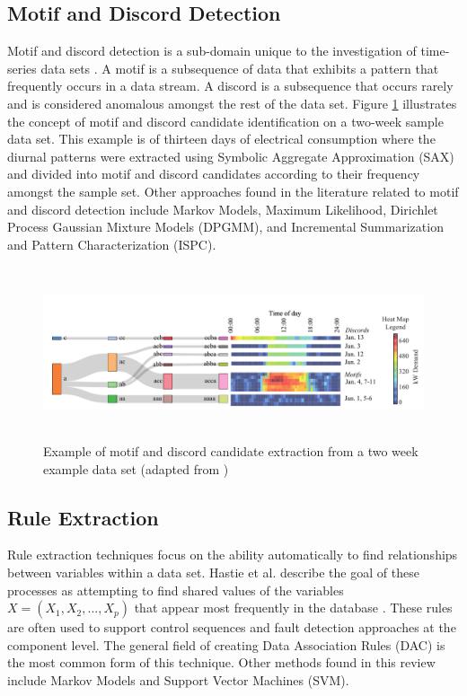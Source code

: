 \documentclass[preprint,12pt,3p]{elsarticle}
\begin{document}
\subsection{Motif and Discord Detection}
Motif and discord detection is a sub-domain unique to the investigation of time-series data sets \cite{senin_grammarviz_2014}. A motif is a subsequence of data that exhibits a pattern that frequently occurs in a data stream. A discord is a subsequence that occurs rarely and is considered anomalous amongst the rest of the data set. Figure \ref{fig:motifdiscordexample} illustrates the concept of motif and discord candidate identification on a two-week sample data set. This example is of thirteen days of electrical consumption where the diurnal patterns were extracted using Symbolic Aggregate Approximation (SAX) and divided into motif and discord candidates according to their frequency amongst the sample set. Other approaches found in the literature related to motif and discord detection include Markov Models, Maximum Likelihood, Dirichlet Process Gaussian Mixture Models (DPGMM), and Incremental Summarization and Pattern Characterization (ISPC).

\begin{figure}[ht!]
\centering
\includegraphics[height=2in]{./Data/DiscordSankeyExampleWithHeatmapV2}
\caption{Example of motif and discord candidate extraction from a two week example data set (adapted from \cite{miller_automated_2015})}
\label{fig:motifdiscordexample}
\end{figure}

\subsection{Rule Extraction}
Rule extraction techniques focus on the ability automatically to find relationships between variables within a data set. Hastie et al. describe the goal of these processes as attempting to find shared values of the variables $X = (X_1,X_2,...,X_p)$ that appear most frequently in the database \cite{hastie_elements_2009}. These rules are often used to support control sequences and fault detection approaches at the component level. The general field of creating Data Association Rules (DAC) is the most common form of this technique. Other methods found in this review include Markov Models and Support Vector Machines (SVM).
\end{document}
